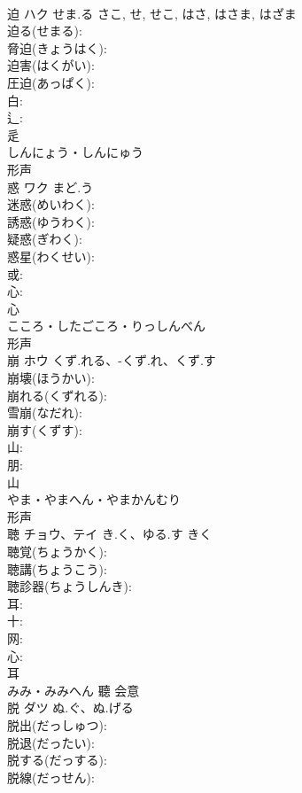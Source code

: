 \documentclass[8pt]{extreport}
\begin{document}
\begin{CJK}{UTF8}{min}
\\	迫	ハク	せま.る	さこ, せ, せこ, はさ, はさま, はざま	
\\	迫る(せまる): 
\\	脅迫(きょうはく): 
\\	迫害(はくがい): 
\\	圧迫(あっぱく): 
\\	白: 
\\	辶: 
\\	辵	
\\	しんにょう・しんにゅう	
\\	形声 
\\	惑	ワク	まど.う		
\\	迷惑(めいわく): 
\\	誘惑(ゆうわく): 
\\	疑惑(ぎわく): 
\\	惑星(わくせい): 
\\	或: 
\\	心: 
\\	心	
\\	こころ・したごころ・りっしんべん	
\\	形声 
\\	崩	ホウ	くず.れる、-くず.れ、くず.す		
\\	崩壊(ほうかい): 
\\	崩れる(くずれる): 
\\	雪崩(なだれ): 
\\	崩す(くずす): 
\\	山: 
\\	朋: 
\\	山	
\\	やま・やまへん・やまかんむり	
\\	形声 
\\	聴	チョウ、テイ	き.く、ゆる.す	きく	
\\	聴覚(ちょうかく): 
\\	聴講(ちょうこう): 
\\	聴診器(ちょうしんき): 
\\	耳: 
\\	十: 
\\	网: 
\\	心: 
\\	耳	
\\	みみ・みみへん	聽	会意 
\\	脱	ダツ	ぬ.ぐ、ぬ.げる		
\\	脱出(だっしゅつ): 
\\	脱退(だったい): 
\\	脱する(だっする): 
\\	脱線(だっせん): 

\end{CJK}
\end{document}
